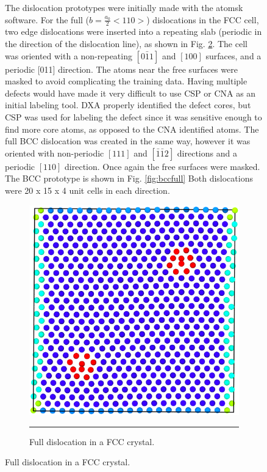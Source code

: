 \documentclass[12pt]{iopart}
\begin{document}
\begin{figure}[htbp]
The dislocation prototypes were initially made with the atomsk software. For the full ($b=\frac{a_0}{2}<110>$) dislocations in the FCC cell, two edge dislocations were inserted into a repeating slab (periodic in the direction of the dislocation line), as shown in Fig. \ref{fig:fccfull}. The cell was oriented with a non-repeating $[0\bar{1}1]$ and $[100]$ surfaces, and a periodic [011] direction. The atoms near the free surfaces were masked to avoid complicating the training data. Having multiple defects would have made it very difficult to use CSP or CNA as an initial labeling tool. DXA properly identified the defect cores, but CSP was used for labeling the defect since it was sensitive enough to find more core atoms, as opposed to the CNA identified atoms. The full BCC dislocation was created in the same way, however it was oriented with non-periodic $[111]$ and $[\bar{1}\bar{1}2]$ directions and a periodic $[110]$ direction. Once again the free surfaces were masked. The BCC prototype is shown in Fig. \ref{fig:bccfull} Both dislocations were 20 x 15 x 4 unit cells in each direction.

\begin{figure}[htbp]
  \centering
    \includegraphics[scale=0.2]{Figures/FCC_FULL_BiDef.png.eps}
    \rule{35em}{0.5pt}
  \caption[]{Full dislocation in a FCC crystal.}
  \label{fig:fccfull}
\end{figure}


\end{figure}
\end{document}
